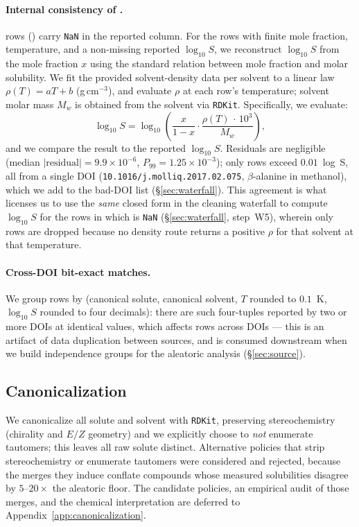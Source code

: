\paragraph{Internal consistency of {\logS}.}
 rows () carry \texttt{NaN} in the reported
\logS{} column. For the  rows with finite mole fraction, temperature, and a non-missing reported $\log_{10} S$, we reconstruct $\log_{10} S$ from the
mole fraction $x$ using the standard relation between mole fraction and
molar solubility.  We fit the provided solvent-density data per solvent to a linear law $\rho(T) = aT + b$ (g\,cm$^{-3}$), and
evaluate $\rho$ at each row's temperature; solvent molar mass $M_w$ is
obtained from the solvent \SMILES{} via \texttt{RDKit}.  Specifically,
we evaluate:
\[
    \log_{10} S = \log_{10}\!\left(\frac{x}{1-x}\cdot\frac{\rho(T)\,\cdot\,10^{3}}{M_w}\right),
\]
and we compare the result to the reported $\log_{10} S$.
Residuals are negligible (median $|\mathrm{residual}| = 9.9\times 10^{-6}$,
$P_{99} = 1.25\times 10^{-3}$); only  rows exceed $0.01$~log~S,
all from a single DOI (\verb|10.1016/j.molliq.2017.02.075|, $\beta$-alanine
in methanol), which we add to the bad-DOI list (§\ref{sec:waterfall}).
This agreement is what licenses us to use the \emph{same} closed form in
the cleaning waterfall to compute $\log_{10} S$ for the rows in which
{\logS} is \texttt{NaN} (§\ref{sec:waterfall}, step~W5), wherein only  rows are dropped because no density route returns a positive $\rho$ for that solvent at that temperature.

\paragraph{Cross-DOI bit-exact matches.}
We group rows by (canonical solute, canonical solvent, $T$ rounded to
$0.1$~K, $\log_{10} S$ rounded to four decimals): there are  such four-tuples
reported by two or more DOIs at identical values, which affects  rows
across  DOIs --- this is an artifact of data duplication between sources, and is consumed downstream when we build independence groups for the aleatoric analysis (§\ref{sec:source}).

\subsection{Canonicalization}
\label{sec:canonicalization}

We canonicalize all solute and solvent \SMILES{} with \texttt{RDKit},
preserving stereochemistry (chirality and $E/Z$ geometry) and we explicitly choose to \emph{not} enumerate tautomers; this leaves all  raw solute \SMILES{} distinct. Alternative policies that strip stereochemistry or enumerate tautomers were considered and rejected, because the merges they induce conflate compounds whose measured solubilities disagree by $5$--$20\times$ the aleatoric floor. The candidate policies, an empirical audit of those merges, and the chemical interpretation are deferred to Appendix~\ref{app:canonicalization}.

